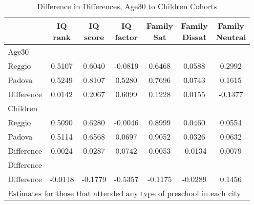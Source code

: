 \begin{table}[htbp]\centering
\caption{Difference in Differences, Age30 to Children Cohorts}
\begin{tabular}{l*{6}{c}}
\hline\hline
            &     IQ rank&    IQ score&   IQ factor&  Family Sat&Family Dissat&Family Neutral\\
\hline
Age30       &            &            &            &            &            &            \\
Reggio      &      0.5107&      0.6040&     -0.0819&      0.6468&      0.0588&      0.2992\\
Padova      &      0.5249&      0.8107&      0.5280&      0.7696&      0.0743&      0.1615\\
Difference  &      0.0142&      0.2067&      0.6099&      0.1228&      0.0155&     -0.1377\\
\hline
Children    &            &            &            &            &            &            \\
Reggio      &      0.5090&      0.6280&     -0.0046&      0.8999&      0.0460&      0.0554\\
Padova      &      0.5114&      0.6568&      0.0697&      0.9052&      0.0326&      0.0632\\
Difference  &      0.0024&      0.0287&      0.0742&      0.0053&     -0.0134&      0.0079\\
\hline
Difference  &            &            &            &            &            &            \\
Difference  &     -0.0118&     -0.1779&     -0.5357&     -0.1175&     -0.0289&      0.1456\\
\hline\hline
\multicolumn{7}{l}{\footnotesize Estimates for those that attended any type of preschool in each city}\\
\end{tabular}
\end{table}
